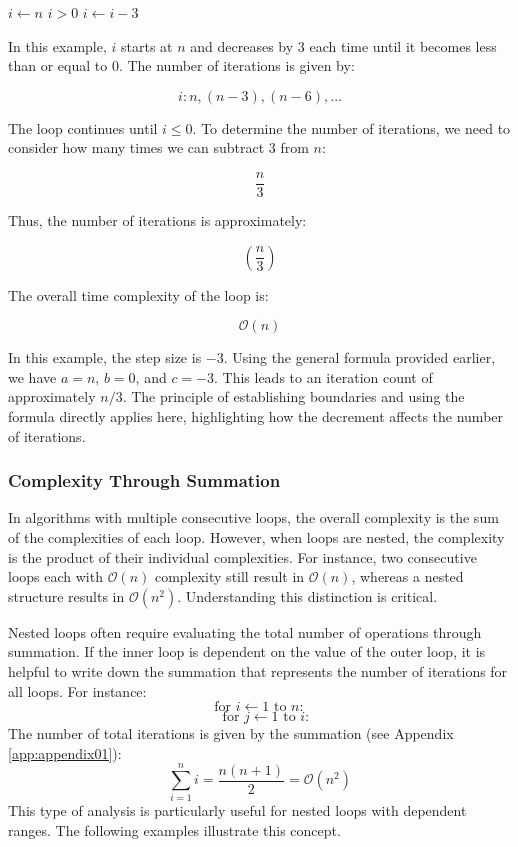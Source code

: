 \begin{example}

    \begin{codebox}
        \li $i \gets n$
        \li \While $i > 0$ \Do
        \li     {}
        \li     $i \gets i - 3$
            \End
    \end{codebox}

    In this example, $i$ starts at $n$ and decreases by $3$ each time until it becomes less than or equal to $0$. The number of iterations is given by:

    \[
    i: n, (n - 3), (n - 6), \dots
    \]

    The loop continues until $i \leq 0$. To determine the number of iterations, we need to consider how many times we can subtract $3$ from $n$:

    \[
    \frac{n}{3}
    \]

    Thus, the number of iterations is approximately:

    \[
    \left( \frac{n}{3} \right)
    \]

    The overall time complexity of the loop is:

    \[
    \mathcal{O}(n)
    \] 

    In this example, the step size is $-3$. Using the general formula provided earlier, we have $a = n$, $b = 0$, and $c = -3$. This leads to an iteration count of approximately $n / 3$. The principle of establishing boundaries and using the formula directly applies here, highlighting how the decrement affects the number of iterations.

\end{example}


\subsubsection*{Complexity Through Summation}
In algorithms with multiple consecutive loops, the overall complexity is the sum of the complexities of each loop. However, when loops are nested, the complexity is the product of their individual complexities. For instance, two consecutive loops each with $\mathcal{O}(n)$ complexity still result in $\mathcal{O}(n)$, whereas a nested structure results in $\mathcal{O}(n^2)$. Understanding this distinction is critical.

Nested loops often require evaluating the total number of operations through summation. If the inner loop is dependent on the value of the outer loop, it is helpful to write down the summation that represents the number of iterations for all loops. For instance:
\[
\text{for } i \gets 1 \text{ to } n:
\]
\[
\quad \text{for } j \gets 1 \text{ to } i:
\]
The number of total iterations is given by the summation (see Appendix \ref{app:appendix01}):
\[
\sum_{i=1}^{n} i = \frac{n(n + 1)}{2} = \mathcal{O}(n^2)
\]
This type of analysis is particularly useful for nested loops with dependent ranges. The following examples illustrate this concept.

